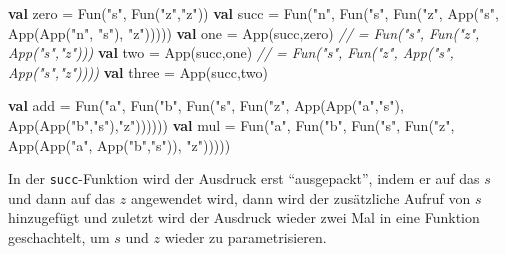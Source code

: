 \documentclass[]{article}
\newenvironment{Shaded}{}{}
\newcommand{\CommentTok}[1]{\textcolor[rgb]{0.38,0.63,0.69}{\textit{#1}}}
\newcommand{\FunctionTok}[1]{\textcolor[rgb]{0.02,0.16,0.49}{#1}}
\newcommand{\KeywordTok}[1]{\textcolor[rgb]{0.00,0.44,0.13}{\textbf{#1}}}
\newcommand{\NormalTok}[1]{#1}
\newcommand{\StringTok}[1]{\textcolor[rgb]{0.25,0.44,0.63}{#1}}
\begin{document}
\begin{Shaded}
\begin{Highlighting}[]
\KeywordTok{val}\NormalTok{ zero = }\FunctionTok{Fun}\NormalTok{(}\StringTok{"s"}\NormalTok{, }\FunctionTok{Fun}\NormalTok{(}\StringTok{"z"}\NormalTok{,}\StringTok{"z"}\NormalTok{))}
\KeywordTok{val}\NormalTok{ succ = }\FunctionTok{Fun}\NormalTok{(}\StringTok{"n"}\NormalTok{, }\FunctionTok{Fun}\NormalTok{(}\StringTok{"s"}\NormalTok{, }\FunctionTok{Fun}\NormalTok{(}\StringTok{"z"}\NormalTok{, }\FunctionTok{App}\NormalTok{(}\StringTok{"s"}\NormalTok{, }\FunctionTok{App}\NormalTok{(}\FunctionTok{App}\NormalTok{(}\StringTok{"n"}\NormalTok{, }\StringTok{"s"}\NormalTok{), }\StringTok{"z"}\NormalTok{)))))}
\KeywordTok{val}\NormalTok{ one = }\FunctionTok{App}\NormalTok{(succ,zero) }\CommentTok{// = Fun("s", Fun("z", App("s","z")))}
\KeywordTok{val}\NormalTok{ two = }\FunctionTok{App}\NormalTok{(succ,one) }\CommentTok{// = Fun("s", Fun("z", App("s", App("s","z"))))}
\KeywordTok{val}\NormalTok{ three = }\FunctionTok{App}\NormalTok{(succ,two)}

\KeywordTok{val}\NormalTok{ add = }
  \FunctionTok{Fun}\NormalTok{(}\StringTok{"a"}\NormalTok{, }\FunctionTok{Fun}\NormalTok{(}\StringTok{"b"}\NormalTok{, }\FunctionTok{Fun}\NormalTok{(}\StringTok{"s"}\NormalTok{, }\FunctionTok{Fun}\NormalTok{(}\StringTok{"z"}\NormalTok{, }
    \FunctionTok{App}\NormalTok{(}\FunctionTok{App}\NormalTok{(}\StringTok{"a"}\NormalTok{,}\StringTok{"s"}\NormalTok{), }\FunctionTok{App}\NormalTok{(}\FunctionTok{App}\NormalTok{(}\StringTok{"b"}\NormalTok{,}\StringTok{"s"}\NormalTok{),}\StringTok{"z"}\NormalTok{))))))}
\KeywordTok{val}\NormalTok{ mul = }
  \FunctionTok{Fun}\NormalTok{(}\StringTok{"a"}\NormalTok{, }\FunctionTok{Fun}\NormalTok{(}\StringTok{"b"}\NormalTok{, }\FunctionTok{Fun}\NormalTok{(}\StringTok{"s"}\NormalTok{, }\FunctionTok{Fun}\NormalTok{(}\StringTok{"z"}\NormalTok{, }
    \FunctionTok{App}\NormalTok{(}\FunctionTok{App}\NormalTok{(}\StringTok{"a"}\NormalTok{, }\FunctionTok{App}\NormalTok{(}\StringTok{"b"}\NormalTok{,}\StringTok{"s"}\NormalTok{)), }\StringTok{"z"}\NormalTok{)))))}
\end{Highlighting}
\end{Shaded}

In der \texttt{succ}-Funktion wird der Ausdruck erst ``ausgepackt'',
indem er auf das \(s\) und dann auf das \(z\) angewendet wird, dann wird
der zusätzliche Aufruf von \(s\) hinzugefügt und zuletzt wird der
Ausdruck wieder zwei Mal in eine Funktion geschachtelt, um \(s\) und
\(z\) wieder zu parametrisieren.
\end{document}
